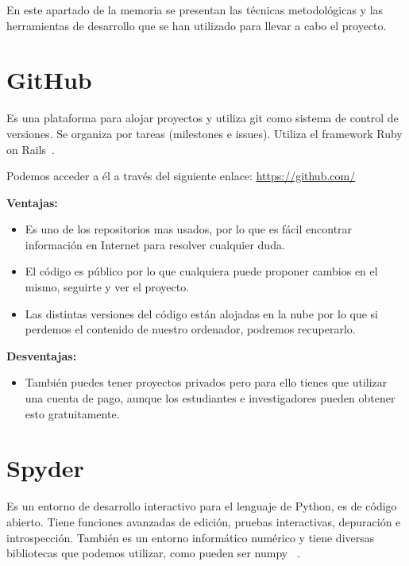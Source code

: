 
En este apartado de la memoria se presentan las técnicas metodológicas y las herramientas de desarrollo que se han utilizado para llevar a cabo el proyecto. 

\section{GitHub}
Es una plataforma para alojar proyectos y utiliza git como sistema de control de versiones. Se organiza por tareas (milestones e issues).
Utiliza el framework Ruby on Rails~\cite{github}.

Podemos acceder a él a través del siguiente enlace: 
\url{https://github.com/}

\textbf{Ventajas:}

\begin{itemize}
\item Es uno de los repositorios mas usados, por lo que es fácil encontrar información en Internet para resolver cualquier duda.

\item El código es público por lo que cualquiera puede proponer cambios en el mismo, seguirte y ver el proyecto.

\item Las distintas versiones del código están alojadas en la nube por lo que si perdemos el contenido de nuestro ordenador, podremos recuperarlo.
\end{itemize}

\textbf{Desventajas:}

\begin{itemize}
\item También puedes tener proyectos privados pero para ello tienes que utilizar una cuenta de pago, aunque los estudiantes e investigadores pueden obtener esto gratuitamente.
\end{itemize}


\section{Spyder}
Es un entorno de desarrollo interactivo para el lenguaje de Python, es de código abierto.
Tiene funciones avanzadas de edición, pruebas interactivas, depuración e introspección. También es un entorno informático numérico y tiene diversas bibliotecas que podemos utilizar, como pueden ser numpy ~\cite{spyder}.


